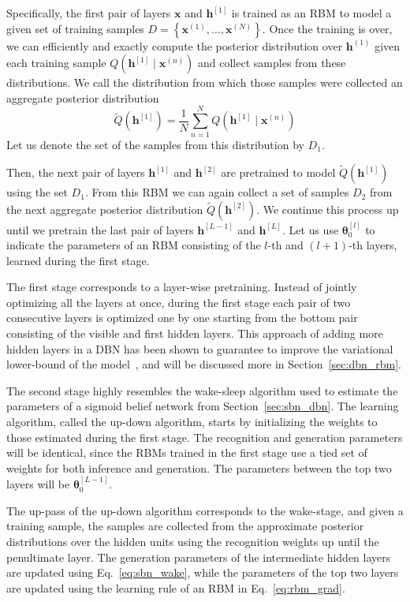 \documentclass{now}
\newcommand{\qlay}[1]{\left[#1\right]}
\newcommand{\vect}[1]{\mathbf{#1}}
\newcommand{\vects}[1]{\boldsymbol{#1}}
\newcommand{\vh}[0]{\vect{h}}
\newcommand{\vx}[0]{\vect{x}}
\newcommand{\TT}[0]{{\vects{\theta}}}
\begin{document}
Specifically, the first pair of layers $\vx$ and $\vh^{\qlay{1}}$ is trained as
an RBM to model a given set of training samples $D=\left\{ \vx^{(1)}, \dots,
\vx^{(N)} \right\}$.  Once the training is over, we can efficiently and exactly
compute the posterior distribution over $\vh^{(1)}$ given each training sample
$Q(\vh^{\qlay{1}} \mid \vx^{(n)})$ and collect samples from these distributions.
We call the distribution from which those samples were collected an aggregate
posterior distribution
\[
\tilde{Q}\left( \vh^{\qlay{1}} \right) = \frac{1}{N}
\sum_{n=1}^N Q\left(\vh^{\qlay{1}} \mid \vx^{(n)}\right)
\]
Let us denote the set of the samples from this distribution by $D_1$. 

Then, the next pair of layers $\vh^{\qlay{1}}$ and $\vh^{\qlay{2}}$ are
pretrained to model $\tilde{Q}\left( \vh^{\qlay{1}} \right)$ using the set
$D_1$. From this RBM we can again collect a set of samples $D_2$ from the next
aggregate posterior distribution $\tilde{Q}\left( \vh^{\qlay{2}} \right)$. We
continue this process up until we pretrain the last pair of layers
$\vh^{\qlay{L-1}}$ and $\vh^{\qlay{L}}$. Let us use $\TT_0^{\qlay{l}}$ to
indicate the parameters of an RBM consisting of the $l$-th and $(l+1)$-th
layers, learned during the first stage.

The first stage corresponds to a layer-wise pretraining.  Instead of jointly
optimizing all the layers at once, during the first stage each pair of two
consecutive layers is optimized one by one starting from the bottom pair
consisting of the visible and first hidden layers. This approach of adding more
hidden layers in a DBN has been shown to guarantee to improve the variational
lower-bound of the model~\citep{Hinton2006nc}, and will be discussed more in
Section~\ref{sec:dbn_rbm}.

The second stage highly resembles the wake-sleep algorithm used to estimate the
parameters of a sigmoid belief network from Section~\ref{sec:sbn_dbn}. The
learning algorithm, called the up-down algorithm, starts by initializing the
weights to those estimated during the first stage. The recognition and
generation parameters will be identical, since the RBMs trained in the first
stage use a tied set of weights for both inference and generation. The
parameters between the top two layers will be $\TT_0^{\qlay{L-1}}$.

The up-pass of the up-down algorithm corresponds to the wake-stage, and given a
training sample, the samples are collected from the approximate posterior
distributions over the hidden units using the recognition weights up until the
penultimate layer. The generation parameters of the intermediate hidden layers
are updated using Eq.~\eqref{eq:sbn_wake}, while the parameters of the top two
layers are updated using the learning rule of an RBM in Eq.~\eqref{eq:rbm_grad}.
\end{document}
